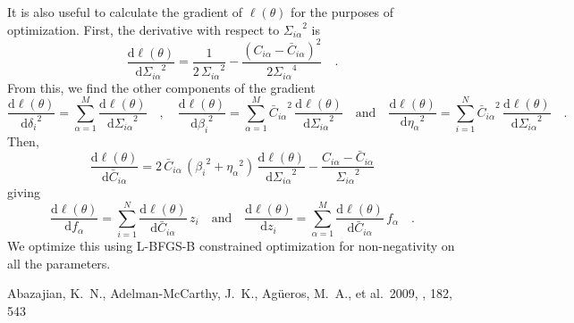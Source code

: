 \documentclass[12pt,preprint]{aastex}
\newcommand{\dd}{\mathrm{d}}
\newcommand{\nstars}{\ensuremath{M}}
\newcommand{\nobs}  {\ensuremath{N}}
\newcommand{\st}    {\ensuremath{\alpha}}
\newcommand{\obs}   {\ensuremath{i}}
\newcommand{\jabs}  {\ensuremath{\delta_\obs}}
\newcommand{\vs}    {\ensuremath{\eta_\st}}
\newcommand{\vo}    {\ensuremath{\beta_\obs}}
\newcommand{\sig}   {\ensuremath{\Sigma_{\obs\st}}}
\newcommand{\fstar} {\ensuremath{f_\st}}
\newcommand{\fobs}  {\ensuremath{z_\obs}}
\newcommand{\Cobs}  {\ensuremath{C_{\obs\st}}}
\newcommand{\Cmod}  {\ensuremath{\bar{C}_{\obs\st}}}
\begin{document}
It is also useful to calculate the gradient of $\ell (\theta)$ for the
purposes of optimization. First, the derivative with respect to $\sig^2$ is
\begin{equation}
    \frac{\dd \ell (\theta)}{\dd \sig^2} =
        \frac{1}{2\,\sig^2} - \frac{(\Cobs - \Cmod)^2}{2 \sig^4} \quad.
\end{equation}
From this, we find the other components of the gradient
\begin{equation}
    \frac{\dd \ell (\theta)}{\dd \jabs^2} = \sum_{\st=1}^\nstars
        \frac{\dd \ell (\theta)}{\dd \sig^2}
    \quad , \quad
    \frac{\dd \ell (\theta)}{\dd \vo^2} = \sum_{\st=1}^\nstars
        \Cmod^2 \, \frac{\dd \ell (\theta)}{\dd \sig^2}
    \quad \mathrm{and} \quad
    \frac{\dd \ell (\theta)}{\dd \vs^2} = \sum_{\obs=1}^\nobs
        \Cmod^2 \, \frac{\dd \ell (\theta)}{\dd \sig^2}
    \quad.
\end{equation}
Then,
\begin{equation}
    \frac{\dd \ell(\theta)}{\dd \Cmod} =
        2 \, \Cmod \, \left (\vo^2 + \vs^2\right ) \,
        \frac{\dd \ell (\theta)}{\dd \sig^2}
        - \frac{\Cobs - \Cmod}{\sig^2}
\end{equation}
giving
\begin{equation}
    \frac{\dd \ell (\theta)}{\dd \fstar} = \sum_{\obs=1}^\nobs
        \frac{\dd \ell(\theta)}{\dd \Cmod} \, \fobs
    \quad \mathrm{and} \quad
    \frac{\dd \ell (\theta)}{\dd \fobs} = \sum_{\st=1}^\nstars
        \frac{\dd \ell(\theta)}{\dd \Cmod} \, \fstar
    \quad.
\end{equation}
We optimize this using L-BFGS-B constrained optimization for non-negativity
on all the parameters.

\begin{thebibliography}{}\raggedright

 Abazajian, K.~N.,
Adelman-McCarthy, J.~K., Ag{\"u}eros, M.~A., et al.\ 2009, \apjs, 182, 543

\end{thebibliography}
\end{document}
